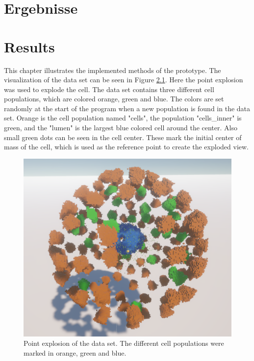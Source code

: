 {\chapter{Ergebnisse}}
{\chapter{Results}}

\label{sec:results}


This chapter illustrates the implemented methods of the prototype.
The visualization of the data set can be seen in Figure \ref{fig:PointExplosionPicture}. Here the point explosion was used to explode the cell.
The data set contains three different cell populations, which are colored orange, green and blue. The colors are set randomly at the start of the program when a new population is found in the data set. Orange is the cell population named "cells", the population "cells\_inner" is green, and the "lumen" is the largest blue colored cell around the center.
Also small green dots can be seen in the cell center. These mark the initial center of mass of the cell, which is used as the reference point to create the exploded view.
\begin{figure}[h]
	\centering
	\includegraphics[width=.6\linewidth]{fig/Images/PointExplosionPicture}
	\caption[]{Point explosion of the data set. The different cell populations were marked in orange, green and blue. }
	\label{fig:PointExplosionPicture}
\end{figure}

